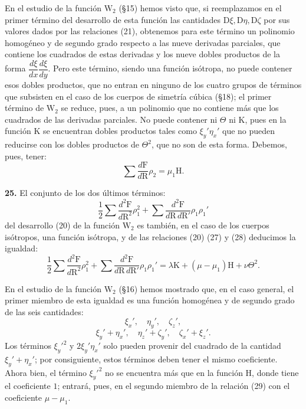 En el estudio de la función $\mathrm{W}_2$ (§15) hemos visto que, si
reemplazamos en el primer término del desarrollo de esta función las
cantidades $\mathrm{D}\xi,\mathrm{D}\eta,\mathrm{D}\zeta$ por sus valores
dados por las relaciones (21), obtenemos para este término un polinomio
homogéneo y de segundo grado respecto a las nueve derivadas parciales,
que contiene los cuadrados de estas derivadas y los nueve dobles productos
de la forma $\dfrac{d\xi}{dx}\dfrac{d\xi}{dy}$. Pero este término, siendo
una función isótropa, no puede contener esos dobles productos, que no
entran en ninguno de los cuatro grupos de términos que subsisten en el caso
de los cuerpos de simetría cúbica (§18); el primer término de $\mathrm{W}_2$
se reduce, pues, a un polinomio que no contiene más que los cuadrados de
las derivadas parciales. No puede contener ni $\Theta$ ni $\mathrm{K}$,
pues en la función $\mathrm{K}$ se encuentran dobles productos tales como
$\xi_y'\eta_x'$ que no pueden reducirse con los dobles productos de
$\Theta^2$, que no son de esta forma. Debemos, pues, tener:
\begin{equation}
\sum\frac{d\mathrm{F}}{d\mathrm{R}}\rho_2=\mu_1\mathrm{H}.
\tag{28}
\end{equation}

\noindent\textbf{25.} El conjunto de los dos últimos términos:
\[
\frac12\sum\frac{d^2\mathrm{F}}{d\mathrm{R}^2}\rho_1^2
+\sum\frac{d^2\mathrm{F}}{d\mathrm{R}\,d\mathrm{R}'}\rho_1\rho_1'
\]
del desarrollo (20) de la función $\mathrm{W}_2$ es también, en el caso de
los cuerpos isótropos, una función isótropa, y de las relaciones (20) (27)
y (28) deducimos la igualdad:
\begin{equation}
\frac12\sum\frac{d^2\mathrm{F}}{d\mathrm{R}^2}\rho_1^2
+\sum\frac{d^2\mathrm{F}}{d\mathrm{R}\,d\mathrm{R}'}\rho_1\rho_1'
=\lambda\mathrm{K}+(\mu-\mu_1)\mathrm{H}+\nu\Theta^2.
\tag{29}
\end{equation}

En el estudio de la función $\mathrm{W}_2$ (§16) hemos mostrado que, en
el caso general, el primer miembro de esta igualdad es una función homogénea y de segundo
grado de las seis cantidades:
\[
\xi_x',\quad \eta_y',\quad \zeta_z',
\]
\[
\xi_y'+\eta_x',\quad \eta_z'+\zeta_y',\quad \zeta_x'+\xi_z'.
\]
Los términos $\xi_y'^2$ y $2\xi_y'\eta_x'$ solo pueden provenir del
cuadrado de la cantidad $\xi_y'+\eta_x'$; por consiguiente, estos términos
deben tener el mismo coeficiente. Ahora bien, el término $\xi_y'^2$ no se
encuentra más que en la función $\mathrm{H}$, donde tiene el coeficiente
$1$; entrará, pues, en el segundo miembro de la relación (29) con el
coeficiente $\mu-\mu_1$.

